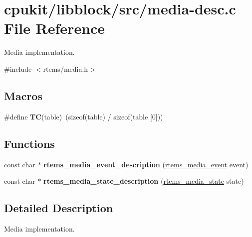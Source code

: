 \hypertarget{media-desc_8c}{}\section{cpukit/libblock/src/media-\/desc.c File Reference}
\label{media-desc_8c}


Media implementation.  


{\ttfamily \#include $<$rtems/media.\+h$>$}\newline
\subsection*{Macros}
\begin{DoxyCompactItemize}
\item 
\mbox{\label{media-desc_8c_ae000ef489aced7b3ae4a251aed75c8c5}} 
\#define {\bfseries TC}(table)~(sizeof(table) / sizeof(table \mbox{[}0\mbox{]}))
\end{DoxyCompactItemize}
\subsection*{Functions}
\begin{DoxyCompactItemize}
\item 
const char $\ast$ {\bfseries rtems\+\_\+media\+\_\+event\+\_\+description} (\mbox{\hyperlink{group__RTEMSIOMedia_gadd58c5799ee997413d4d6be2ac05197b}{rtems\+\_\+media\+\_\+event}} event)
\item 
const char $\ast$ {\bfseries rtems\+\_\+media\+\_\+state\+\_\+description} (\mbox{\hyperlink{group__RTEMSIOMedia_gaaec542a8c74e36e4edf774f2313fcd7c}{rtems\+\_\+media\+\_\+state}} state)
\end{DoxyCompactItemize}


\subsection{Detailed Description}
Media implementation. 

